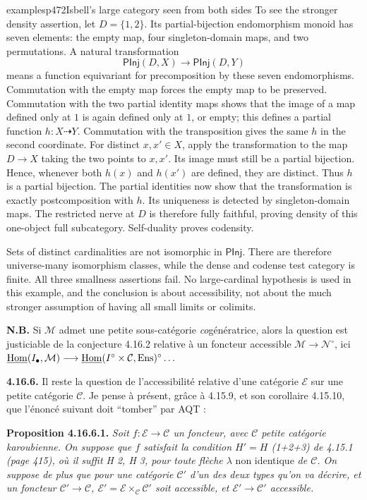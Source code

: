 \begin{dcomment}{examples}{p472}{Isbell's large category seen from both sides}
To see the stronger density assertion, let $D=\{1,2\}$. Its partial-bijection endomorphism monoid has seven elements: the empty map, four singleton-domain maps, and two permutations. A natural transformation
\[
 \mathsf{PInj}(D,X)\longrightarrow\mathsf{PInj}(D,Y)
\]
means a function equivariant for precomposition by these seven endomorphisms. Commutation with the empty map forces the empty map to be preserved. Commutation with the two partial identity maps shows that the image of a map defined only at $1$ is again defined only at $1$, or empty; this defines a partial function $h:X\dashrightarrow Y$. Commutation with the transposition gives the same $h$ in the second coordinate. For distinct $x,x'\in X$, apply the transformation to the map $D\to X$ taking the two points to $x,x'$. Its image must still be a partial bijection. Hence, whenever both $h(x)$ and $h(x')$ are defined, they are distinct. Thus $h$ is a partial bijection. The partial identities now show that the transformation is exactly postcomposition with $h$. Its uniqueness is detected by singleton-domain maps. The restricted nerve at $D$ is therefore fully faithful, proving density of this one-object full subcategory. Self-duality proves codensity.

Sets of distinct cardinalities are not isomorphic in $\mathsf{PInj}$. There are therefore universe-many isomorphism classes, while the dense and codense test category is finite. All three smallness assertions fail. No large-cardinal hypothesis is used in this example, and the conclusion is about accessibility, not about the much stronger assumption of having all small limits or colimits.
\end{dcomment}


\textbf{N.B.} Si $\mathcal{M}$ admet une petite sous-catégorie \textit{co}génératrice, alors la question est justiciable de la conjecture 4.16.2 relative à un foncteur accessible $\mathcal{M} \longrightarrow \mathcal{N}^\circ$, ici $\underline{\operatorname{Hom}}(I_\bullet,\mathcal{M}) \longrightarrow \underline{\operatorname{Hom}}(I^\circ \times \mathcal{C},\mathrm{Ens})^\circ \dots$

\textbf{4.16.6.} Il reste la question de l'accessibilité relative d'une catégorie $\mathcal{E}$ sur une petite catégorie $\mathcal{C}$. Je pense à présent, grâce à 4.15.9, et son corollaire 4.15.10, que l'énoncé suivant doit “tomber” par AQT :

\textbf{Proposition 4.16.6.1.} \textit{Soit $f : \mathcal{E} \longrightarrow \mathcal{C}$ un foncteur, avec $\mathcal{C}$ petite catégorie karoubienne. On suppose que $f$ satisfait la condition $H' = H$ (1+2+3) de 4.15.1 (page 415), où il suffit H 2, H 3, pour toute flèche $\lambda$} non identique \textit{de $\mathcal{C}$. On suppose de plus que pour une catégorie $\mathcal{C}'$ d'un des deux types qu'on va décrire, et un foncteur $\mathcal{C}' \longrightarrow \mathcal{C}$, $\mathcal{E}' = \mathcal{E} \times_{\mathcal{C}} \mathcal{C}'$ soit accessible, et $\mathcal{E}' \longrightarrow \mathcal{C}'$ accessible.}

